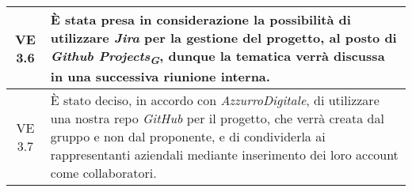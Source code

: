 \begin{table}[htbp]
\begin{tabular}{|c|p{}|}
        \hline
        VE 3.6 & È stata presa in considerazione la possibilità di utilizzare \emph{Jira} per la gestione del progetto, al posto di 
        \emph{Github Projects}\textsubscript{\textit{\textbf{G}}}, dunque la tematica verrà discussa in una successiva riunione interna. \\
        \hline
        VE 3.7 & È stato deciso, in accordo con \emph{AzzurroDigitale}, di utilizzare una nostra repo \emph{GitHub} per il progetto, che verrà creata dal gruppo
        e non dal proponente, e di condividerla ai rappresentanti aziendali mediante inserimento dei loro account come collaboratori. \\
        \hline
    \end{tabular}
    \end{table}
